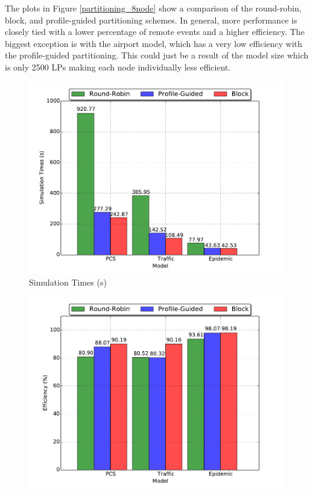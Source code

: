 \documentclass[11pt]{book}
\begin{document}
The plots in Figure \ref{partitioning_8node} show a comparison of the round-robin, block, and
profile-guided partitioning schemes.  In general, more performance is closely tied with a lower
percentage of remote events and a higher efficiency.  The biggest exception is with the airport
model, which has a very low efficiency with the profile-guided partitioning.  This could just
be a result of the model size which is only 2500 LPs making each node individually less efficient.

\begin{figure}
  \begin{minipage}{.5\textwidth}
    \begin{center}
      \includegraphics[width=\textwidth,keepaspectratio,quiet]{figs/partitioning_communication/partitioning_time_8node.pdf} \\
      Simulation Times (s) \\
    \end{center}
  \end{minipage}%
  \hfill
  \begin{minipage}{.5\textwidth}
    \begin{center}
      \includegraphics[width=\textwidth,keepaspectratio,quiet]{figs/partitioning_communication/partitioning_efficiency_8node.pdf} \\

\end{center}
\end{minipage}
\end{figure}
\end{document}
